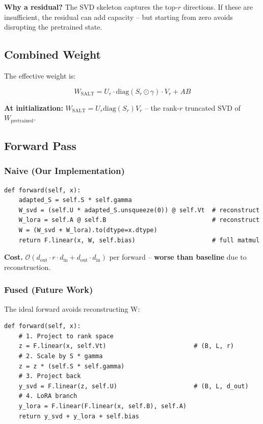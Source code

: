 \textbf{Why a residual?} The SVD skeleton captures the top-$r$ directions. If 
these are insufficient, the residual can add capacity -- but starting from 
zero avoids disrupting the pretrained state.

\subsection{Combined Weight}

The effective weight is:

\[
W_\text{SALT} = U_r \cdot \text{diag}(S_r \odot \gamma) \cdot V_r + A B
\tag{4.5}
\]

\textbf{At initialization:} $W_\text{SALT} = U_r \text{diag}(S_r) V_r$ -- the 
rank-$r$ truncated SVD of $W_\text{pretrained}$.

\subsection{Forward Pass}

\subsubsection{Naive (Our Implementation)}

\begin{lstlisting}
def forward(self, x):
    adapted_S = self.S * self.gamma
    W_svd = (self.U * adapted_S.unsqueeze(0)) @ self.Vt  # reconstruct
    W_lora = self.A @ self.B                             # reconstruct
    W = (W_svd + W_lora).to(dtype=x.dtype)
    return F.linear(x, W, self.bias)                     # full matmul
\end{lstlisting}

\textbf{Cost.} $\mathcal{O}(d_\text{out} \cdot r \cdot d_\text{in} + d_\text{out} \cdot d_\text{in})$ 
per forward -- \textbf{worse than baseline} due to reconstruction.

\subsubsection{Fused (Future Work)}

The ideal forward avoids reconstructing W:

\begin{lstlisting}
def forward(self, x):
    # 1. Project to rank space
    z = F.linear(x, self.Vt)                        # (B, L, r)
    # 2. Scale by S * gamma
    z = z * (self.S * self.gamma)
    # 3. Project back
    y_svd = F.linear(z, self.U)                     # (B, L, d_out)
    # 4. LoRA branch
    y_lora = F.linear(F.linear(x, self.B), self.A)
    return y_svd + y_lora + self.bias
\end{lstlisting}


